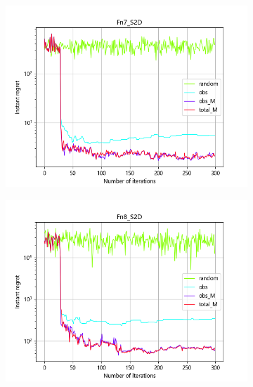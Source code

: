 \documentclass{article}
\begin{document}
\begin{figure}[H]
\begin{subfigure}[t]{.32\linewidth}
        \includegraphics[width=1\textwidth]{pictures/Homo_noise_2D/S/Fn7_S2D_ins.png}
    \end{subfigure}
    \begin{subfigure}[t]{.32\linewidth}
        \centering
        \includegraphics[width=1\textwidth]{pictures/Homo_noise_2D/S/Fn8_S2D_ins.png}
    \end{subfigure}
    \begin{subfigure}[t]{.32\linewidth}
        \centering

\end{subfigure}
\end{figure}
\end{document}
